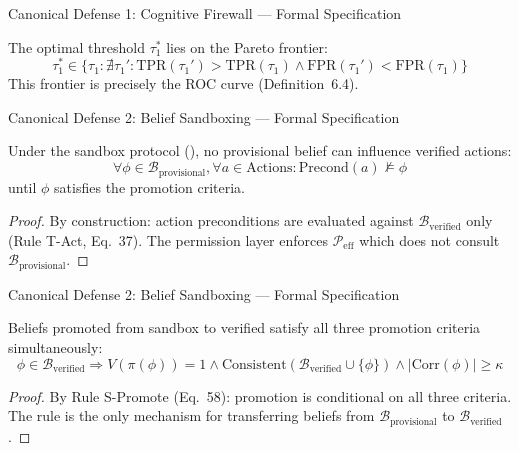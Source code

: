 \documentclass[
  ignorenonframetext,
]{beamer}
\providecommand{\cref}[1]{\texttt{\detokenize{#1}}}
\begin{document}
\begin{frame}[allowframebreaks]{Canonical Defense 1: Cognitive Firewall
--- Formal Specification}
\begin{corollary}
\label{cor:pareto-threshold}
The optimal threshold $\tau_1^*$ lies on the Pareto frontier:
\begin{equation}
\label{eq:pareto-threshold}
\tau_1^* \in \{\tau_1 : \nexists \tau_1': \text{TPR}(\tau_1') > \text{TPR}(\tau_1) \land \text{FPR}(\tau_1') < \text{FPR}(\tau_1)\}
\end{equation}
This frontier is precisely the ROC curve (Definition~6.4).
\end{corollary}
\end{frame}

\begin{frame}[allowframebreaks]{Canonical Defense 2: Belief Sandboxing
--- Formal Specification}
\protect{}\label{canonical-defense-2-belief-sandboxing-formal-specification}
\begin{theorem}
\label{thm:sandbox-isolation}
Under the sandbox protocol (\cref{sec:sandbox-rules}), no provisional belief can influence verified actions:
\begin{equation}
\label{eq:sandbox-isolation}
\forall \phi \in \mathcal{B}_{\text{provisional}}, \forall a \in \text{Actions}: \text{Precond}(a) \not\models \phi
\end{equation}
until $\phi$ satisfies the promotion criteria.
\end{theorem}

\begin{proof}
By construction: action preconditions are evaluated against $\mathcal{B}_{\text{verified}}$ only (Rule T-Act, Eq.~37). The permission layer enforces $\mathcal{P}_{\text{eff}}$ which does not consult $\mathcal{B}_{\text{provisional}}$.
\end{proof}

\end{frame}

\begin{frame}[allowframebreaks]{Canonical Defense 2: Belief Sandboxing
--- Formal Specification}
\begin{theorem}
\label{thm:sandbox-soundness}
Beliefs promoted from sandbox to verified satisfy all three promotion criteria simultaneously:
\begin{equation}
\label{eq:sandbox-soundness}
\phi \in \mathcal{B}_{\text{verified}} \Rightarrow V(\pi(\phi)) = 1 \land \text{Consistent}(\mathcal{B}_{\text{verified}} \cup \{\phi\}) \land |\text{Corr}(\phi)| \geq \kappa
\end{equation}
\end{theorem}

\begin{proof}
By Rule S-Promote (Eq.~58): promotion is conditional on all three criteria. The rule is the only mechanism for transferring beliefs from $\mathcal{B}_{\text{provisional}}$ to $\mathcal{B}_{\text{verified}}$.
\end{proof}
\end{frame}
\end{document}
